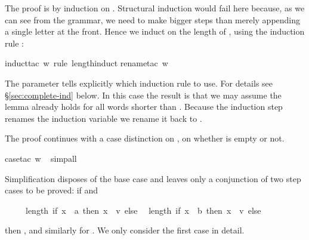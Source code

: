 \begin{isabellebody}
\begin{isamarkuptxt}
\noindent
The proof is by induction on . Structural induction would fail here
because, as we can see from the grammar, we need to make bigger steps than
merely appending a single letter at the front. Hence we induct on the length
of , using the induction rule :%
\end{isamarkuptxt}%
\isamarkuptrue%
\isamarkupfalse%
{}induct{}tac\ w\ rule{}\ length{}induct{}\isanewline
{}\isamarkupfalse%
{}rename{}tac\ w{}%
\begin{isamarkuptxt}%
\noindent
The  parameter tells  explicitly which induction
rule to use. For details see \S\ref{sec:complete-ind} below.
In this case the result is that we may assume the lemma already
holds for all words shorter than . Because the induction step renames
the induction variable we rename it back to .

The proof continues with a case distinction on ,
on whether  is empty or not.%
\end{isamarkuptxt}%
\isamarkuptrue%
\isamarkupfalse%
{}case{}tac\ w{}\isanewline
\ \isamarkupfalse%
{}simp{}all{}%
\begin{isamarkuptxt}%
\noindent
Simplification disposes of the base case and leaves only a conjunction
of two step cases to be proved:
if  and \begin{isabelle}%
\ \ \ \ \ length\ {}if\ x\ {}\ a\ then\ {}x\ {}\ v{}\ else\ {}{}{}\ {}\isanewline
\isaindent{\ \ \ \ \ }length\ {}if\ x\ {}\ b\ then\ {}x\ {}\ v{}\ else\ {}{}{}\ {}\ {}%
\end{isabelle} then
, and similarly for .
We only consider the first case in detail.


\end{isamarkuptxt}
\end{isabellebody}
